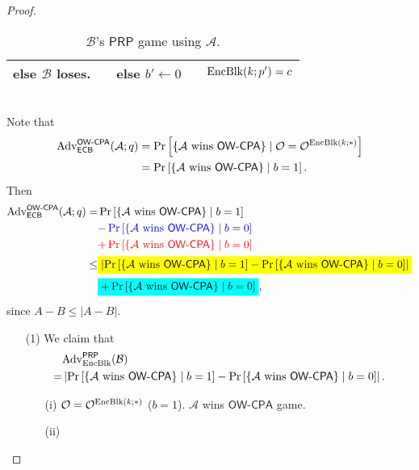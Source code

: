 \documentclass[12pt,openany]{book}
\newcommand{\mathcolorbox}[2]{\colorbox{#1}{$\displaystyle #2$}}
\theoremstyle{definition}
\newcommand{\set}[1]{\left\{#1\right\}}
\newcommand{\abs}[1]{\left\lvert #1 \right\rvert}
\newcommand{\A}{\mathcal{A}}
\newcommand{\oracle}{\mathcal{O}}
\newcommand{\ECB}{\mathsf{ECB}}
\newcommand{\OW}{\mathsf{OW}}
\newcommand{\PRP}{\mathsf{PRP}}
\newcommand{\CPA}{\mathsf{CPA}}
\newcommand{\Adv}{\textnormal{Adv}}
\newcommand{\EncBlk}{\textnormal{EncBlk}}
\begin{document}
\begin{proof}
\begin{table}[h]
\begin{tabular}{ccccc}
				else $\mathcal{B}$ loses. & & else $b'\gets 0$ & & $\EncBlk(k;p')=c$\\
				\bottomrule[1.5pt]
			\end{tabular}
		\caption{$\mathcal{B}$'s $\PRP$ game using $\A$.}
		\end{table}\\
		Note that \begin{align*}
			\Adv_{\ECB}^{\OW\text{-}\CPA}(\A;q)&=\Pr\left[\set{\text{$\A$ wins $\OW$-$\CPA$}}\mid\oracle=\oracle^{\EncBlk(k;*)}\right]\\
			&=\Pr\left[\set{\text{$\A$ wins $\OW$-$\CPA$}}\mid b=1\right].
		\end{align*}
		Then \begin{align*}
			\Adv_{\ECB}^{\OW\text{-}\CPA}(\A;q)
			=&\Pr\left[\set{\text{$\A$ wins $\OW$-$\CPA$}}\mid b=1\right]\\
			&\textcolor{blue}{-\Pr\left[\set{\text{$\A$ wins $\OW$-$\CPA$}}\mid b=0\right]}\\
			&\textcolor{red}{+\Pr\left[\set{\text{$\A$ wins $\OW$-$\CPA$}}\mid b=0\right]}\\
			\leq&\mathcolorbox{-blue}{\abs{\Pr\left[\set{\text{$\A$ wins $\OW$-$\CPA$}}\mid b=1\right]-\Pr\left[\set{\text{$\A$ wins $\OW$-$\CPA$}}\mid b=0\right]}}\\
			&\mathcolorbox{-red}{+\Pr\left[\set{\text{$\A$ wins $\OW$-$\CPA$}}\mid b=0\right]},
		\end{align*} since $A-B\leq\abs{A-B}$.
		\begin{enumerate}
			\item[(1)] We claim that \begin{align*}
			&\Adv_{\textnormal{EncBlk}}^{\PRP}(\mathcal{B})\\
			=&\abs{\Pr\left[\set{\text{$\A$ wins $\OW$-$\CPA$}}\mid b=1\right]-\Pr\left[\set{\text{$\A$ wins $\OW$-$\CPA$}}\mid b=0\right]}.
			\end{align*}
			\begin{enumerate}
				\item[(i)] $\oracle=\oracle^{\EncBlk(k;*)}$ ($b=1$). $\A$ wins $\OW$-$\CPA$ game.
				\item[(ii)]
			\end{enumerate}
		\end{enumerate}
	\end{proof}

\end{document}
